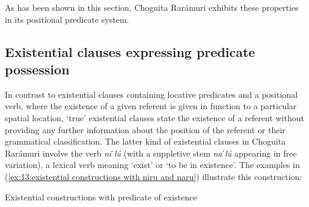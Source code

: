 As has been shown in this section, Choguita Rarámuri exhibits these properties in its positional predicate system.

\subsection{Existential clauses expressing predicate possession}
\label{subsec: predicates of possession}

In contrast to existential clauses containing locative predicates and a positional verb, where the existence of a given referent is given in function to a particular spatial location, ‘true’ existential clauses state the existence of a referent without providing any further information about the position of the referent or their grammatical classification. The latter kind of existential clauses in Choguita Rarámuri involve the verb \textit{niˈlú} (with a suppletive stem \textit{naˈlú} appearing in free variation), a lexical verb meaning `exist' or `to be in existence'. The examples in (\ref{ex:13:existential constructions with niru and naru}) illustrate this construction:

\ea\label{ex:13:existential constructions with niru and naru}
{Existential constructions with predicate of existence}

